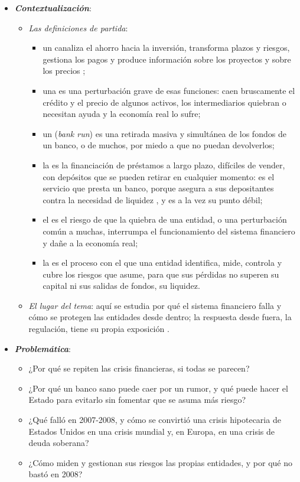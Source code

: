 \documentclass[11pt]{article}
\begin{document}
\begin{itemize}
\item \textbf{\emph{Contextualización}}:
  \begin{itemize}
  \item \emph{Las definiciones de partida}:
    \begin{itemize}
    \item un  canaliza el ahorro hacia la inversión, transforma plazos y riesgos, gestiona los pagos y produce información sobre los proyectos y sobre los precios ;
    \item una  es una perturbación grave de esas funciones: caen bruscamente el crédito y el precio de algunos activos, los intermediarios quiebran o necesitan ayuda y la economía real lo sufre\nocite{ClaessensKose2013Financial};
    \item un  (\emph{bank run}) es una retirada masiva y simultánea de los fondos de un banco, o de muchos, por miedo a que no puedan devolverlos;
    \item la  es la financiación de préstamos a largo plazo, difíciles de vender, con depósitos que se pueden retirar en cualquier momento: es el servicio que presta un banco, porque asegura a sus depositantes contra la necesidad de liquidez , y es a la vez su punto débil;
    \item el  es el riesgo de que la quiebra de una entidad, o una perturbación común a muchas, interrumpa el funcionamiento del sistema financiero y dañe a la economía real;
    \item la  es el proceso con el que una entidad identifica, mide, controla y cubre los riesgos que asume, para que sus pérdidas no superen su capital ni sus salidas de fondos, su liquidez.
    \end{itemize}
  \item \emph{El lugar del tema}: aquí se estudia por qué el sistema financiero falla y cómo se protegen las entidades desde dentro; la respuesta desde fuera, la regulación, tiene su propia exposición .
  \end{itemize}

\item \textbf{\emph{Problemática}}:
  \begin{itemize}
  \item ¿Por qué se repiten las crisis financieras, si todas se parecen?
  \item ¿Por qué un banco sano puede caer por un rumor, y qué puede hacer el Estado para evitarlo sin fomentar que se asuma más riesgo?
  \item ¿Qué falló en 2007-2008, y cómo se convirtió una crisis hipotecaria de Estados Unidos en una crisis mundial y, en Europa, en una crisis de deuda soberana?
  \item ¿Cómo miden y gestionan sus riesgos las propias entidades, y por qué no bastó en 2008?
  \end{itemize}


\end{itemize}
\end{document}

